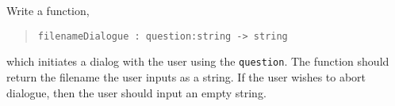 \label{io:filenameDialogue}
Write a function,
\begin{quote}
  \mbox{\lstinline!filenameDialogue : question:string -> string!}
\end{quote}
which initiates a dialog with the user using the
\lstinline{question}. The function should return the filename the user
inputs as a string. If the user wishes to abort dialogue, then the
user should input an empty string.

